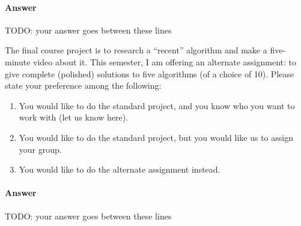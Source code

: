 \documentclass{article}
\begin{document}
\paragraph{Answer}


TODO: your answer goes between these lines


\nextprob
{}

The final course project is to research a ``recent'' algorithm and make a
five-minute video about it.  This semester, I am offering an alternate
assignment: to give complete (polished) solutions to five algorithms (of a
choice of 10).
Please state your preference among the following:

\begin{enumerate}
    \item You would like to do the standard project, and you know who you want
        to work with (let us know here).
    \item You would like to do the standard project, but you would like us to
        assign your group.
    \item You would like to do the alternate assignment instead.
\end{enumerate}

\paragraph{Answer}


TODO: your answer goes between these lines

\end{document}
